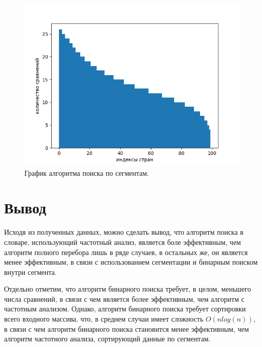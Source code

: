 \begin{figure}[H]
	\centering
	\includegraphics[scale=0.9]{inc/seg_sorted.png}
	\caption{График алгоритма поиска по сегментам.}
	\label{fig:seg_sc_sorted}
\end{figure}

\section{Вывод}

Исходя из полученных данных, можно сделать вывод, что алгоритм поиска в словаре, использующий частотный анализ, является боле эффективным, чем алгоритм полного перебора лишь в ряде случаев, в остальных же, он является менее эффективным, в связи с использованием сегментации и бинарным поиском внутри сегмента.

Отдельно отметим, что алгоритм бинарного поиска требует, в целом, меньшего числа сравнений, в связи с чем является более эффективным, чем алгоритм с частотным анализом. Однако, алгоритм бинарного поиска требует сортировки всего входного массива, что, в среднем случаи имеет сложность $O(nlog(n))$, в связи с чем алгоритм бинарного поиска становится менее эффективным, чем алгоритм частотного анализа, сортирующий данные по сегментам.

